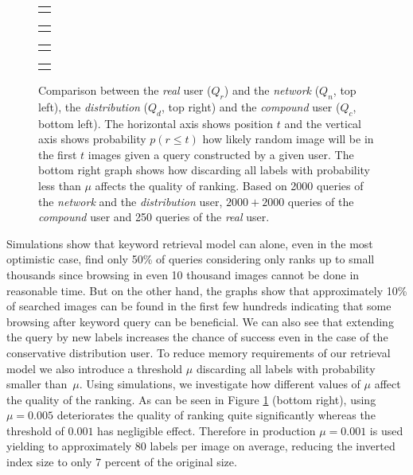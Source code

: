\begin{figure}[ht]
	\centering
	
	\begin{tabular}{@{}c@{}}
		\subfloat{
			
		}
	\end{tabular}
	\begin{tabular}{@{}c@{}}
		\subfloat{
			
		}
	\end{tabular}
	\begin{tabular}{@{}c@{}}
	\subfloat{
		
	}
	\end{tabular}
	\begin{tabular}{@{}c@{}}
		\subfloat{
			
		}
	\end{tabular}

	
	\caption[Comparison between an artificial and the real user]{Comparison between the \textit{real} user ($Q_r$) and the \textit{network} ($Q_n$, top left), the \textit{distribution} ($Q_d$, top right) and the \textit{compound} user ($Q_c$, bottom left). The horizontal axis shows position $t$ and the vertical axis shows probability $p(r\leq t)$ how likely random image will be in the first $t$ images given a query constructed by a given user. The bottom right graph shows how discarding all labels with probability less than $\mu$ affects the quality of ranking. Based on 2000 queries of the \textit{network} and the \textit{distribution} user, $2000+2000$ queries of the \textit{compound} user and 250 queries of the \textit{real} user.}
	\label{fig:simulation_keyword}
\end{figure}
Simulations show that keyword retrieval model can alone, even in the most optimistic case, find only 50\% of queries considering only ranks up to small thousands since browsing in even 10 thousand images cannot be done in reasonable time. But on the other hand, the graphs show that approximately 10\% of searched images can be found in the first few hundreds indicating that some browsing after keyword query can be beneficial. We can also see that extending the query by new labels increases the chance of success even in the case of the conservative distribution user.
To reduce memory requirements of our retrieval model we also introduce a threshold $\mu$ discarding all labels with probability smaller than~$\mu$. Using simulations, we investigate how different values of $\mu$ affect the quality of the ranking. As can be seen in Figure \ref{fig:simulation_keyword} (bottom right), using $\mu=0.005$ deteriorates the quality of ranking quite significantly whereas the threshold of $0.001$ has negligible effect. Therefore in production $\mu = 0.001$ is used yielding to approximately 80 labels per image on average, reducing the inverted index size to only 7 percent of the original size.

